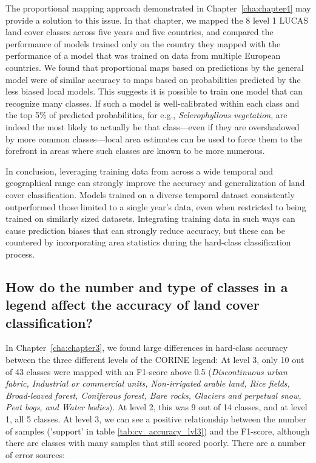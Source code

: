         The proportional mapping approach demonstrated in Chapter\@~\ref{cha:chapter4} may provide a solution to this issue. In that chapter, we mapped the 8 level 1 LUCAS land cover classes across five years and five countries, and compared the performance of models trained only on the country they mapped with the performance of a model that was trained on data from multiple European countries. We found that proportional maps based on predictions by the general model were of similar accuracy to maps based on probabilities predicted by the less biased local models. This suggests it is possible to train one model that can recognize many classes. If such a model is well-calibrated within each class and the top 5\% of predicted probabilities, for e.g., \textit{Sclerophyllous vegetation}, are indeed the most likely to actually be that class---even if they are overshadowed by more common classes---local area estimates can be used to force them to the forefront in areas where such classes are known to be more numerous. 

        In conclusion, leveraging training data from across a wide temporal and geographical range can strongly improve the accuracy and generalization of land cover classification. Models trained on a diverse temporal dataset consistently outperformed those limited to a single year's data, even when restricted to being trained on similarly sized datasets. Integrating training data in such ways can cause prediction biases that can strongly reduce accuracy, but these can be countered by incorporating area statistics during the hard-class classification process.
        
    \subsection{How do the number and type of classes in a legend affect the accuracy of land cover classification?}
    \label{syn:rq3}

        In Chapter\@~\ref{cha:chapter3}, we found large differences in hard-class accuracy between the three different levels of the CORINE legend: At level 3, only 10 out of 43 classes were mapped with an F1-score above 0.5 (\textit{Discontinuous urban fabric, Industrial or commercial units, Non-irrigated arable land, Rice fields, Broad-leaved forest, Coniferous forest, Bare rocks, Glaciers and perpetual snow, Peat bogs, and Water bodies}). At level 2, this was 9 out of 14 classes, and at level 1, all 5 classes. At level 3, we can see a positive relationship between the number of samples ('support' in table \ref{tab:cv_accuracy_lvl3}) and the F1-score, although there are classes with many samples that still scored poorly. There are a number of error sources: 

